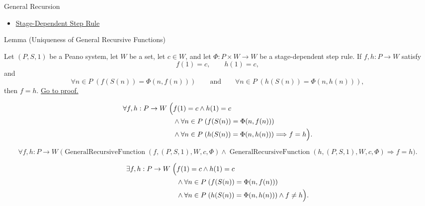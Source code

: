 \begin{topicbox}{General Recursion}
\begin{dependencies}
\begin{itemize}
  \item \hyperref[def:stage-dependent-step-rule]{Stage-Dependent Step Rule}
\end{itemize}
\end{dependencies}

\begin{lemmabox}{Lemma (Uniqueness of General Recursive Functions)}
\begin{lemma}
\label{lem:uniqueness-of-general-recursive-functions}
Let $(P,S,1)$ be a Peano system, let $W$ be a set, let $c\in W$, and let
$\Phi:P\times W\to W$ be a stage-dependent step rule. If $f,h:P\to W$ satisfy
\[
f(1)=c,\qquad h(1)=c,
\]
and
\[
\forall n\in P\;(f(S(n))=\Phi(n,f(n)))
\qquad\text{and}\qquad
\forall n\in P\;(h(S(n))=\Phi(n,h(n))),
\]
then $f=h$.
\hyperref[prf:uniqueness-of-general-recursive-functions]{Go to proof.}
\end{lemma}
\end{lemmabox}

\begin{remark*}
\[
\begin{aligned}
\forall f,h:P\to W\;\Bigl(&
f(1)=c\land h(1)=c\\
&\land \forall n\in P\;(f(S(n))=\Phi(n,f(n)))\\
&\land \forall n\in P\;(h(S(n))=\Phi(n,h(n)))
\Longrightarrow f=h\Bigr).
\end{aligned}
\]
\end{remark*}

\begin{remark*}
\[
\forall f,h:P\to W\;
\bigl(\operatorname{GeneralRecursiveFunction}(f,(P,S,1),W,c,\Phi)
\land \operatorname{GeneralRecursiveFunction}(h,(P,S,1),W,c,\Phi)
\Longrightarrow f=h\bigr).
\]
\end{remark*}

\begin{remark*}
\[
\begin{aligned}
\exists f,h:P\to W\;\Bigl(&
f(1)=c\land h(1)=c\\
&\land \forall n\in P\;(f(S(n))=\Phi(n,f(n)))\\
&\land \forall n\in P\;(h(S(n))=\Phi(n,h(n)))
\land f\neq h\Bigr).
\end{aligned}
\]
\end{remark*}


\end{topicbox}

